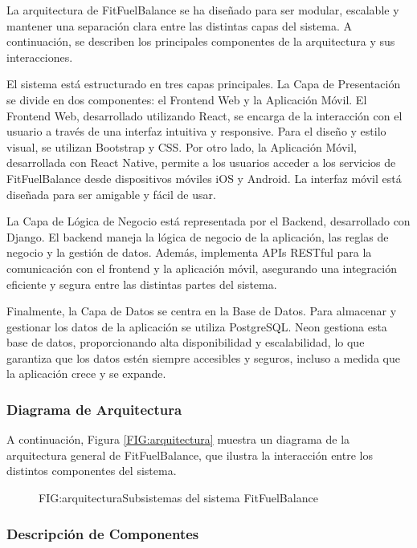 La arquitectura de FitFuelBalance se ha diseñado para ser modular, escalable y mantener una separación clara entre las distintas capas del sistema. A continuación, se describen los principales componentes de la arquitectura y sus interacciones.

El sistema está estructurado en tres capas principales. La Capa de Presentación se divide en dos componentes: el Frontend Web y la Aplicación Móvil. El Frontend Web, desarrollado utilizando React, se encarga de la interacción con el usuario a través de una interfaz intuitiva y responsive. Para el diseño y estilo visual, se utilizan Bootstrap y CSS. Por otro lado, la Aplicación Móvil, desarrollada con React Native, permite a los usuarios acceder a los servicios de FitFuelBalance desde dispositivos móviles iOS y Android. La interfaz móvil está diseñada para ser amigable y fácil de usar.

La Capa de Lógica de Negocio está representada por el Backend, desarrollado con Django. El backend maneja la lógica de negocio de la aplicación, las reglas de negocio y la gestión de datos. Además, implementa APIs RESTful para la comunicación con el frontend y la aplicación móvil, asegurando una integración eficiente y segura entre las distintas partes del sistema.

Finalmente, la Capa de Datos se centra en la Base de Datos. Para almacenar y gestionar los datos de la aplicación se utiliza PostgreSQL. Neon gestiona esta base de datos, proporcionando alta disponibilidad y escalabilidad, lo que garantiza que los datos estén siempre accesibles y seguros, incluso a medida que la aplicación crece y se expande.

\subsubsection{Diagrama de Arquitectura}
A continuación, Figura \ref{FIG:arquitectura} muestra un diagrama de la arquitectura general de FitFuelBalance, que ilustra la interacción entre los distintos componentes del sistema.
\begin{figure}[Distribución Arquitectura]{FIG:arquitectura}{Subsistemas del sistema FitFuelBalance}
\end{figure}

\subsubsection{Descripción de Componentes}

